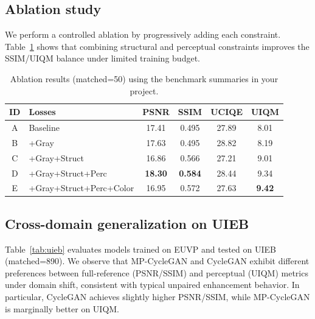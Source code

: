 \documentclass{article}
\begin{document}
\subsection{Ablation study}
We perform a controlled ablation by progressively adding each constraint.
Table~\ref{tab:ablation} shows that combining structural and perceptual constraints improves the SSIM/UIQM balance under limited training budget.

\begin{table}[t]
\centering
\caption{Ablation results (matched=50) using the benchmark summaries in your project.}
\label{tab:ablation}
\small
\setlength{\tabcolsep}{4pt}
\begin{tabular}{c l c c c c}
\toprule
ID & Losses & PSNR & SSIM & UCIQE & UIQM\\
\midrule
A & Baseline & 17.41 & 0.495 & 27.89 & 8.01 \\
B & +Gray & 17.63 & 0.495 & 28.82 & 8.19 \\
C & +Gray+Struct & 16.86 & 0.566 & 27.21 & 9.01 \\
D & +Gray+Struct+Perc & \textbf{18.30} & \textbf{0.584} & 28.44 & 9.34 \\
E & +Gray+Struct+Perc+Color & 16.95 & 0.572 & 27.63 & \textbf{9.42} \\
\bottomrule
\end{tabular}
\end{table}

\subsection{Cross-domain generalization on UIEB}
Table~\ref{tab:uieb} evaluates models trained on EUVP and tested on UIEB (matched=890).
We observe that MP-CycleGAN and CycleGAN exhibit different preferences between full-reference (PSNR/SSIM) and perceptual (UIQM) metrics under domain shift, consistent with typical unpaired enhancement behavior.
In particular, CycleGAN achieves slightly higher PSNR/SSIM, while MP-CycleGAN is marginally better on UIQM.
\end{document}
